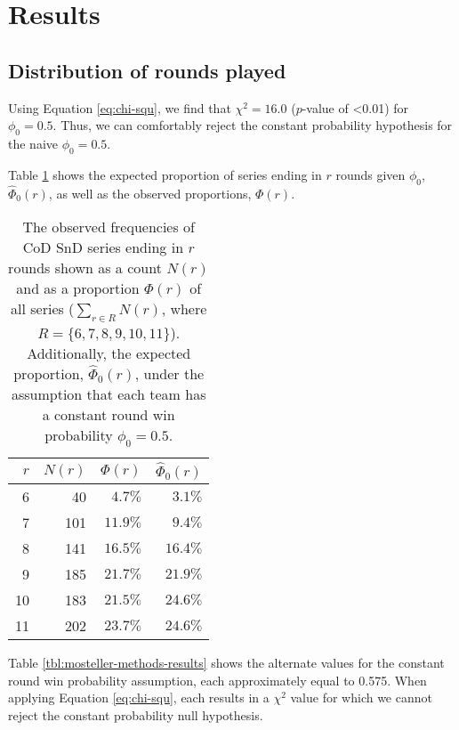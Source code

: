 \documentclass{article}
\begin{document}
\hypertarget{results}{%
\section{Results}\label{results}}

\hypertarget{distribution-of-rounds-played-1}{%
\subsection{Distribution of rounds
played}\label{distribution-of-rounds-played-1}}

Using Equation \ref{eq:chi-squ}, we find that \(\chi^2 = 16.0\)
(\(p\)-value of \textless0.01) for \(\phi_0 = 0.5\). Thus, we can
comfortably reject the constant probability hypothesis for the naive
\(\phi_0 = 0.5\).

Table \ref{tbl:prob-series-lasts-r-rounds} shows the expected proportion
of series ending in \(r\) rounds given \(\phi_0\), \(\hat{\Phi}_0(r)\),
as well as the observed proportions, \(\Phi(r)\).

\begin{table}
\caption{The observed frequencies of CoD SnD series ending in $r$ rounds shown as a count $N(r)$ and as a proportion $\Phi(r)$ of all series ($\sum_{r \in R} N(r)$, where $R = \{6, 7, 8, 9, 10, 11\}$). Additionally, the expected proportion, $\hat{\Phi}_0(r)$, under the assumption that each team has a constant round win probability $\phi_0 = 0.5$.}

\centering
\begin{tabular}{rrrr}
\toprule
$r$ & $N(r)$ & $\Phi(r)$ & $\hat{\Phi}_0(r)$ \\ 
\midrule

6 & 40 & $4.7\%$ & $3.1\%$ \\ 
7 & 101 & $11.9\%$ & $9.4\%$ \\ 
8 & 141 & $16.5\%$ & $16.4\%$ \\ 
9 & 185 & $21.7\%$ & $21.9\%$ \\ 
10 & 183 & $21.5\%$ & $24.6\%$ \\ 
11 & 202 & $23.7\%$ & $24.6\%$ \\ 

\bottomrule
\end{tabular}

\label{tbl:prob-series-lasts-r-rounds}

\end{table}

Table \ref{tbl:mosteller-methods-results} shows the alternate values for
the constant round win probability assumption, each approximately equal
to 0.575. When applying Equation \ref{eq:chi-squ}, each results in a
\(\chi^2\) value for which we cannot reject the constant probability
null hypothesis.
\end{document}
